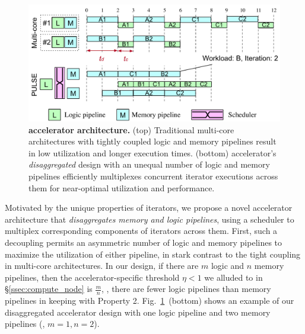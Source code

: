 \begin{figure}[t]
  \centering
  \includegraphics[width=0.9\columnwidth]{fig/pulse/architecture.pdf}
  \vspace{-0.5em}
  \caption{\textbf{\name accelerator architecture.} (top) Traditional multi-core architectures with tightly coupled logic and memory pipelines result in low utilization and longer execution times. (bottom) \name accelerator's \emph{disaggregated} design with an unequal number of logic and memory pipelines efficiently multiplexes concurrent iterator executions across them for near-optimal utilization and performance.}
  \label{fig:architecture_overview}%
\end{figure} 

 Motivated by the unique properties of iterators, we propose a novel accelerator architecture that \emph{disaggregates memory and logic pipelines}, using a scheduler to multiplex corresponding components of iterators across them. First, such a decoupling permits an asymmetric number of logic and memory pipelines to maximize the utilization of either pipeline, in stark contrast to the tight coupling in multi-core architectures. In our design, if there are $m$ logic and $n$ memory pipelines, then the accelerator-specific threshold $\eta < 1$ we alluded to in  \S\ref{ssec:compute_node} is $\frac{m}{n}$, \ie, there are fewer logic pipelines than memory pipelines in keeping with Property 2. Fig.~\ref{fig:architecture_overview}~(bottom) shows an example of our disaggregated accelerator design with one logic pipeline and two memory pipelines (\ie, $m=1, n=2$). 

